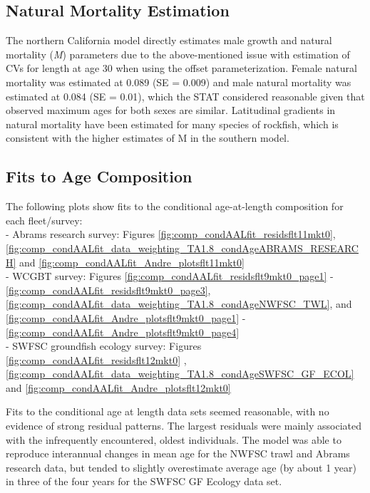 \documentclass[
  english,
  a4paper,
]{article}
\begin{document}
\vspace{0.5cm}

\hypertarget{natural-mortality-estimation}{%
\subsection{Natural Mortality Estimation}\label{natural-mortality-estimation}}

The northern California model directly estimates male growth and natural mortality (\emph{M}) parameters due to the above-mentioned issue with estimation of CVs for length at age 30
when using the offset parameterization. Female natural mortality was estimated at 0.089 (SE = 0.009) and male natural mortality was estimated at 0.084 (SE = 0.01), which the STAT considered reasonable given that observed maximum ages for both sexes are similar. Latitudinal gradients in natural mortality have been estimated for many species of rockfish, which is consistent with the higher estimates of M in the southern model.

\hypertarget{fits-to-age-composition}{%
\subsection{Fits to Age Composition}\label{fits-to-age-composition}}

The following plots show fits to the conditional age-at-length composition for each
fleet/survey:\\
- Abrams research survey: Figures \ref{fig:comp_condAALfit_residsflt11mkt0}, \ref{fig:comp_condAALfit_data_weighting_TA1.8_condAgeABRAMS_RESEARCH} and \ref{fig:comp_condAALfit_Andre_plotsflt11mkt0}\\
- WCGBT survey: Figures \ref{fig:comp_condAALfit_residsflt9mkt0_page1} - \ref{fig:comp_condAALfit_residsflt9mkt0_page3}, \ref{fig:comp_condAALfit_data_weighting_TA1.8_condAgeNWFSC_TWL}, and \ref{fig:comp_condAALfit_Andre_plotsflt9mkt0_page1} - \ref{fig:comp_condAALfit_Andre_plotsflt9mkt0_page4}\\
- SWFSC groundfish ecology survey: Figures \ref{fig:comp_condAALfit_residsflt12mkt0} , \ref{fig:comp_condAALfit_data_weighting_TA1.8_condAgeSWFSC_GF_ECOL} and \ref{fig:comp_condAALfit_Andre_plotsflt12mkt0}

Fits to the conditional age at length data sets seemed reasonable, with no evidence of strong residual patterns. The largest residuals were mainly associated with the infrequently encountered, oldest individuals. The model was able to reproduce interannual changes in mean age for the NWFSC trawl and Abrams research data, but tended to slightly overestimate average age (by about 1 year) in three of the four years for the SWFSC GF Ecology data set.
\end{document}
